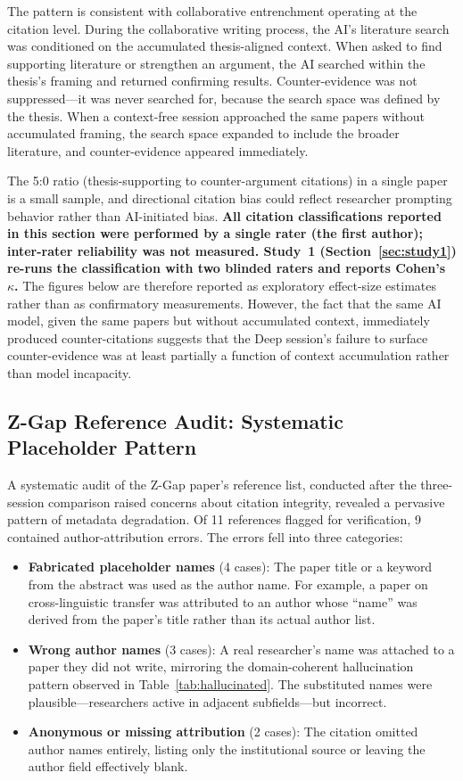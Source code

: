 \documentclass[12pt]{article}
\begin{document}
The pattern is consistent with collaborative entrenchment operating at the citation level. During the collaborative writing process, the AI's literature search was conditioned on the accumulated thesis-aligned context. When asked to find supporting literature or strengthen an argument, the AI searched within the thesis's framing and returned confirming results. Counter-evidence was not suppressed---it was never searched for, because the search space was defined by the thesis. When a context-free session approached the same papers without accumulated framing, the search space expanded to include the broader literature, and counter-evidence appeared immediately.

The 5:0 ratio (thesis-supporting to counter-argument citations) in a single paper is a small sample, and directional citation bias could reflect researcher prompting behavior rather than AI-initiated bias. \textbf{All citation classifications reported in this section were performed by a single rater (the first author); inter-rater reliability was not measured. Study~1 (Section~\ref{sec:study1}) re-runs the classification with two blinded raters and reports Cohen's $\kappa$.} The figures below are therefore reported as exploratory effect-size estimates rather than as confirmatory measurements. However, the fact that the same AI model, given the same papers but without accumulated context, immediately produced counter-citations suggests that the Deep session's failure to surface counter-evidence was at least partially a function of context accumulation rather than model incapacity.

\subsection{Z-Gap Reference Audit: Systematic Placeholder Pattern}
\label{sec:reference-audit}

A systematic audit of the Z-Gap paper's reference list, conducted after the three-session comparison raised concerns about citation integrity, revealed a pervasive pattern of metadata degradation. Of 11 references flagged for verification, 9 contained author-attribution errors. The errors fell into three categories:

\begin{itemize}
    \item \textbf{Fabricated placeholder names} (4 cases): The paper title or a keyword from the abstract was used as the author name. For example, a paper on cross-linguistic transfer was attributed to an author whose ``name'' was derived from the paper's title rather than its actual author list.
    \item \textbf{Wrong author names} (3 cases): A real researcher's name was attached to a paper they did not write, mirroring the domain-coherent hallucination pattern observed in Table~\ref{tab:hallucinated}. The substituted names were plausible---researchers active in adjacent subfields---but incorrect.
    \item \textbf{Anonymous or missing attribution} (2 cases): The citation omitted author names entirely, listing only the institutional source or leaving the author field effectively blank.
\end{itemize}
\end{document}
